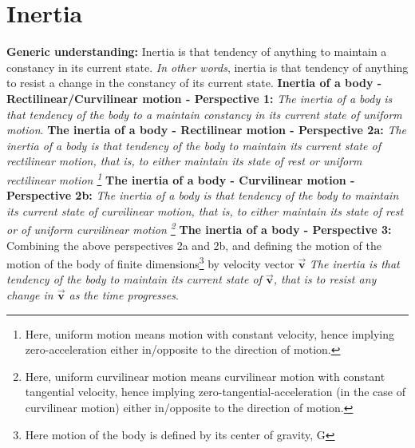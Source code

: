 \chapter{Inertia}

\begin{flushright}
\begin{minipage}[h]{10.5cm}
{\small

\textbf{Generic understanding:} Inertia is that tendency of anything to maintain a constancy in its current state. \textit{In other words}, inertia is that tendency of anything to resist a change in the constancy of its current state. \textbf{Inertia of a body - Rectilinear/Curvilinear motion - Perspective 1:} \textit{The inertia of a body is that tendency of the body to a maintain constancy in its current state of uniform motion}. \textbf{The inertia of a body - Rectilinear motion - Perspective 2a:}  \textit{The inertia of a body is that tendency of the body to maintain its current state of rectilinear motion, that is, to either maintain its state of rest or uniform rectilinear motion \footnote{Here, uniform motion means motion with constant velocity, hence implying zero-acceleration either in/opposite to the direction of motion.}} \textbf{The inertia of a body - Curvilinear motion - Perspective 2b:}  \textit{The inertia of a body is that tendency of the body to maintain its current state of curvilinear motion, that is, to either maintain its state of rest or of uniform curvilinear motion \footnote{Here, uniform curvilinear motion means curvilinear motion with constant tangential velocity, hence implying zero-tangential-acceleration (in the case of curvilinear motion) either in/opposite to the direction of motion.}} \textbf{The inertia of a body - Perspective 3:}  Combining the above perspectives 2a and 2b, and defining the motion of the motion of the body of finite dimensions\footnote{Here motion of the body is defined by its center of gravity, G} by velocity vector $\vec{\mathbf{v}}$ \textit{The inertia is that tendency of the body to maintain its current state of $\vec{\mathbf{v}}$, that is to resist any change in $\vec{\mathbf{v}}$ as the time progresses}.

}
\end{minipage}

\end{flushright}


